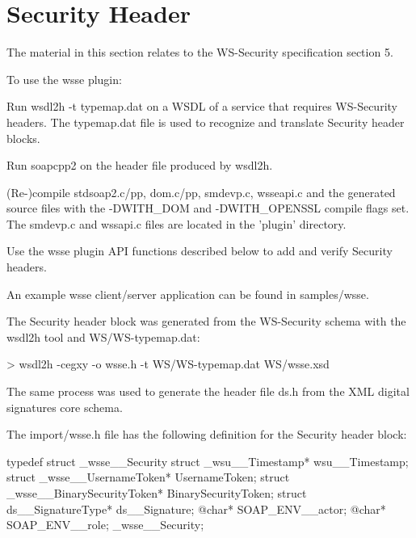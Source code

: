 \hypertarget{wsse_wsse_5}{}\section{Security Header}\label{wsse_wsse_5}
The material in this section relates to the WS-\/Security specification section 5.

To use the wsse plugin:
\begin{DoxyEnumerate}
\item Run wsdl2h -\/t typemap.dat on a WSDL of a service that requires WS-\/Security headers. The typemap.dat file is used to recognize and translate Security header blocks.
\item Run soapcpp2 on the header file produced by wsdl2h.
\item (Re-\/)compile stdsoap2.c/pp, dom.c/pp, smdevp.c, wsseapi.c and the generated source files with the -\/DWITH\_\-DOM and -\/DWITH\_\-OPENSSL compile flags set. The smdevp.c and wssapi.c files are located in the 'plugin' directory.
\item Use the wsse plugin API functions described below to add and verify Security headers.
\end{DoxyEnumerate}

An example wsse client/server application can be found in samples/wsse.

The Security header block was generated from the WS-\/Security schema with the wsdl2h tool and WS/WS-\/typemap.dat:


\begin{DoxyCode}
    > wsdl2h -cegxy -o wsse.h -t WS/WS-typemap.dat WS/wsse.xsd
\end{DoxyCode}


The same process was used to generate the header file ds.h from the XML digital signatures core schema.

The import/wsse.h file has the following definition for the Security header block:


\begin{DoxyCode}
typedef struct _wsse__Security
{       struct _wsu__Timestamp*                 wsu__Timestamp;
        struct _wsse__UsernameToken*            UsernameToken;
        struct _wsse__BinarySecurityToken*      BinarySecurityToken;
        struct ds__SignatureType*               ds__Signature;
        @char*                                  SOAP_ENV__actor;
        @char*                                  SOAP_ENV__role;
} _wsse__Security;
\end{DoxyCode}


